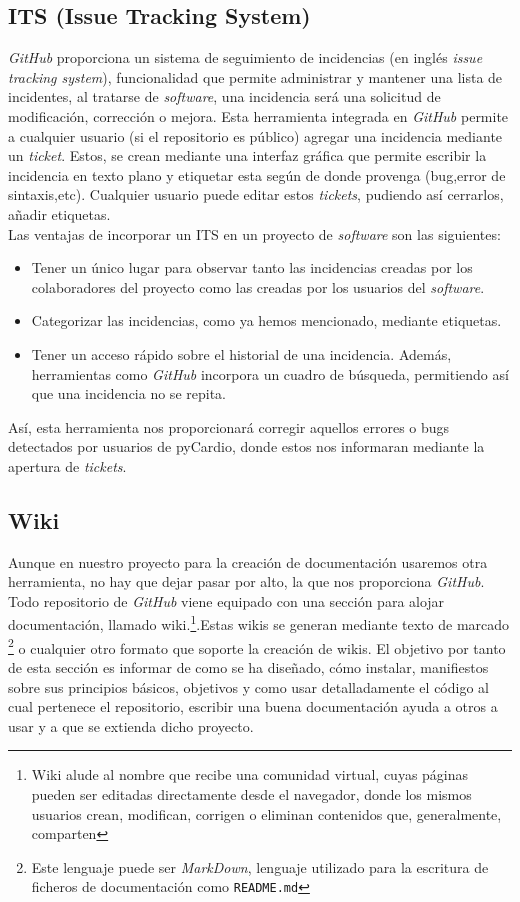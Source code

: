 \documentclass[a4paper, 12pt]{book}
\begin{document}
\subsection{ITS (Issue Tracking System)}
\label{subsec:issue}
\emph{GitHub} proporciona un sistema de seguimiento de incidencias (en inglés \textit{issue tracking system}), funcionalidad que permite administrar y mantener una lista de incidentes, al tratarse de \emph{software}, una incidencia será una solicitud de modificación, corrección o mejora. Esta herramienta integrada en \emph{GitHub} permite a cualquier usuario (si el repositorio es público) agregar una incidencia mediante un \emph{ticket}. Estos, se crean mediante una interfaz gráfica que permite escribir la incidencia en texto plano y etiquetar esta según de donde provenga (bug,error de sintaxis,etc). Cualquier usuario puede editar estos \emph{tickets}, pudiendo así cerrarlos, añadir etiquetas. \\
Las ventajas de incorporar un ITS  en un proyecto de \emph{software} son las siguientes: 
\begin{itemize}
    \item Tener un único lugar para observar tanto las incidencias creadas por los colaboradores del proyecto como las creadas por los usuarios del \emph{software}.
    \item Categorizar las incidencias, como ya hemos mencionado, mediante etiquetas.
    \item Tener un acceso rápido sobre el historial de una incidencia. Además, herramientas como \emph{GitHub} incorpora un cuadro de búsqueda, permitiendo así que una incidencia no se repita.
\end{itemize}
Así, esta herramienta nos proporcionará corregir aquellos errores o bugs detectados por usuarios de pyCardio, donde estos nos informaran mediante la apertura de \emph{tickets}.

\subsection{Wiki}
\label{subsec:wiki}
Aunque en nuestro proyecto para la creación de documentación usaremos otra herramienta, no hay que dejar pasar por alto, la que nos proporciona \emph{GitHub}.\\
Todo repositorio de \emph{GitHub} viene equipado con una sección para alojar documentación, llamado wiki.\footnote{Wiki alude al nombre que recibe una comunidad virtual, cuyas páginas pueden ser editadas directamente desde el navegador, donde los mismos usuarios crean, modifican, corrigen o eliminan contenidos que, generalmente, comparten}.Estas wikis se generan mediante texto de marcado \footnote{Este lenguaje puede ser \emph{MarkDown}, lenguaje utilizado para la escritura de ficheros de documentación como \texttt{README.md}} o cualquier otro formato que soporte la creación de wikis. El objetivo por tanto de esta sección es informar de como se ha diseñado, cómo instalar, manifiestos sobre sus principios básicos, objetivos y como usar detalladamente el código al cual pertenece el repositorio, escribir una buena documentación ayuda a otros a usar y a que se extienda dicho proyecto.
\end{document}
